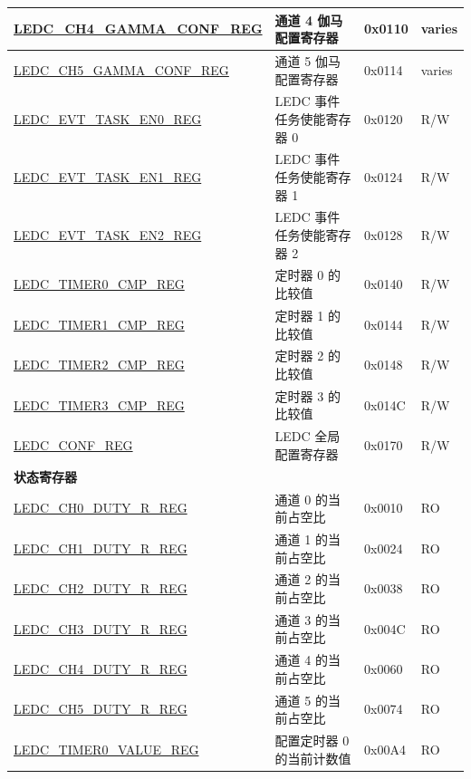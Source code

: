 \begin{longtable}{ | p{5.5cm} | p{6.8cm} | p{1.3cm} | p{2cm} | }
    \hyperref[regdesc:LEDCCHNGAMMACONFREG]{LEDC\_CH4\_GAMMA\_CONF\_REG} & 通道 4 伽马配置寄存器 & 0x0110 & varies \\ \hline
    \hyperref[regdesc:LEDCCHNGAMMACONFREG]{LEDC\_CH5\_GAMMA\_CONF\_REG} & 通道 5 伽马配置寄存器 & 0x0114 & varies \\ \hline
    \hyperref[regdesc:LEDCEVTTASKEN0REG]{LEDC\_EVT\_TASK\_EN0\_REG} & LEDC 事件任务使能寄存器 0 & 0x0120 & R/W \\ \hline
    \hyperref[regdesc:LEDCEVTTASKEN1REG]{LEDC\_EVT\_TASK\_EN1\_REG} & LEDC 事件任务使能寄存器 1 & 0x0124 & R/W \\ \hline
    \hyperref[regdesc:LEDCEVTTASKEN2REG]{LEDC\_EVT\_TASK\_EN2\_REG} & LEDC 事件任务使能寄存器 2 & 0x0128 & R/W \\ \hline
    \hyperref[regdesc:LEDCTIMERNCMPREG]{LEDC\_TIMER0\_CMP\_REG} & 定时器 0 的比较值 & 0x0140 & R/W \\ \hline
    \hyperref[regdesc:LEDCTIMERNCMPREG]{LEDC\_TIMER1\_CMP\_REG} & 定时器 1 的比较值 & 0x0144 & R/W \\ \hline
    \hyperref[regdesc:LEDCTIMERNCMPREG]{LEDC\_TIMER2\_CMP\_REG} & 定时器 2 的比较值 & 0x0148 & R/W \\ \hline
    \hyperref[regdesc:LEDCTIMERNCMPREG]{LEDC\_TIMER3\_CMP\_REG} & 定时器 3 的比较值 & 0x014C & R/W \\ \hline
    \hyperref[regdesc:LEDCCONFREG]{LEDC\_CONF\_REG} & LEDC 全局配置寄存器 & 0x0170 & R/W \\ \hline
    \multicolumn{4}{|l|}{\textbf{状态寄存器}} \\ \hline
    \hyperref[regdesc:LEDCCHNDUTYRREG]{LEDC\_CH0\_DUTY\_R\_REG} & 通道 0 的当前占空比 & 0x0010 & RO \\ \hline
    \hyperref[regdesc:LEDCCHNDUTYRREG]{LEDC\_CH1\_DUTY\_R\_REG} & 通道 1 的当前占空比 & 0x0024 & RO \\ \hline
    \hyperref[regdesc:LEDCCHNDUTYRREG]{LEDC\_CH2\_DUTY\_R\_REG} & 通道 2 的当前占空比 & 0x0038 & RO \\ \hline
    \hyperref[regdesc:LEDCCHNDUTYRREG]{LEDC\_CH3\_DUTY\_R\_REG} & 通道 3 的当前占空比 & 0x004C & RO \\ \hline
    \hyperref[regdesc:LEDCCHNDUTYRREG]{LEDC\_CH4\_DUTY\_R\_REG} & 通道 4 的当前占空比 & 0x0060 & RO \\ \hline
    \hyperref[regdesc:LEDCCHNDUTYRREG]{LEDC\_CH5\_DUTY\_R\_REG} & 通道 5 的当前占空比 & 0x0074 & RO \\ \hline
    \hyperref[regdesc:LEDCTIMERNVALUEREG]{LEDC\_TIMER0\_VALUE\_REG} & 配置定时器 0 的当前计数值 & 0x00A4 & RO \\ \hline

\end{longtable}
